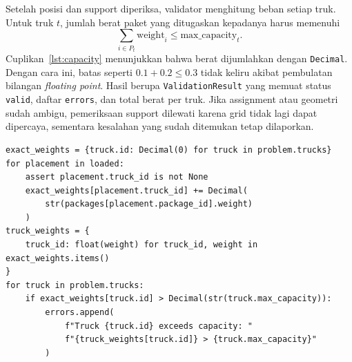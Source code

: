 \documentclass[12pt,a4paper]{article}
\begin{document}
Setelah posisi dan support diperiksa, validator menghitung beban setiap truk. Untuk truk $t$, jumlah berat paket yang ditugaskan kepadanya harus memenuhi
\begin{equation}
\sum_{i\in P_t}\mathrm{weight}_i\leq\mathrm{max\_capacity}_t.
\label{eq:kapasitas}
\end{equation}
Cuplikan~\ref{lst:capacity} menunjukkan bahwa berat dijumlahkan dengan \texttt{Decimal}. Dengan cara ini, batas seperti $0.1+0.2\leq0.3$ tidak keliru akibat pembulatan bilangan \textit{floating point}. Hasil  berupa \texttt{ValidationResult} yang memuat status \texttt{valid}, daftar \texttt{errors}, dan total berat per truk. Jika assignment atau geometri sudah ambigu, pemeriksaan support dilewati karena grid tidak lagi dapat dipercaya, sementara kesalahan yang sudah ditemukan tetap dilaporkan.

\begin{lstlisting}[emph={Decimal,exact_weights,max_capacity,errors},caption={Penjumlahan berat dan pemeriksaan kapasitas},label={lst:capacity}]
exact_weights = {truck.id: Decimal(0) for truck in problem.trucks}
for placement in loaded:
    assert placement.truck_id is not None
    exact_weights[placement.truck_id] += Decimal(
        str(packages[placement.package_id].weight)
    )
truck_weights = {
    truck_id: float(weight) for truck_id, weight in exact_weights.items()
}
for truck in problem.trucks:
    if exact_weights[truck.id] > Decimal(str(truck.max_capacity)):
        errors.append(
            f"Truck {truck.id} exceeds capacity: "
            f"{truck_weights[truck.id]} > {truck.max_capacity}"
        )
\end{lstlisting}
\end{document}
